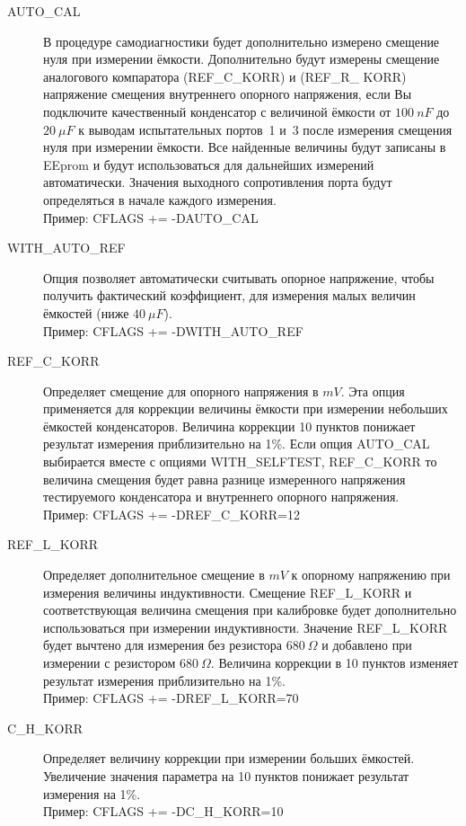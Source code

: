 \begin{description}
  \item[AUTO\_CAL] В процедуре самодиагностики будет дополнительно измерено смещение нуля при измерении ёмкости. 
Дополнительно будут измерены смещение аналогового компаратора (REF\_C\_KORR) и (REF\_R\_ KORR) напряжение смещения 
внутреннего опорного напряжения, если Вы подключите качественный конденсатор с величиной ёмкости от \(100~nF\) 
до \(20~\mu F\) к выводам испытательных портов~1 и~3 после измерения смещения нуля при измерении ёмкости. Все 
найденные величины будут записаны в EEprom и будут использоваться для дальнейших измерений автоматически. Значения 
выходного сопротивления порта будут определяться в начале каждого измерения.\\
Пример: CFLAGS += -DAUTO\_CAL

  \item[WITH\_AUTO\_REF] Опция позволяет автоматически считывать опорное напряжение, чтобы
получить фактический коэффициент, для измерения малых величин ёмкостей (ниже \(40~\mu F\)).\\
Пример:  CFLAGS += -DWITH\_AUTO\_REF

  \item[REF\_C\_KORR] Определяет смещение для опорного напряжения в \(mV\). Эта опция применяется для 
коррекции величины ёмкости при измерении небольших ёмкостей конденсаторов. Величина коррекции 10 пунктов понижает 
результат измерения приблизительно на 1\%. Если опция AUTO\_CAL выбирается вместе с опциями 
WITH\_SELFTEST, REF\_C\_KORR то величина смещения будет равна разнице измеренного напряжения тестируемого 
конденсатора и внутреннего опорного напряжения.\\
Пример:  CFLAGS += -DREF\_C\_KORR=12

  \item[REF\_L\_KORR] Определяет дополнительное смещение в \(mV\) к опорному напряжению при измерения величины 
индуктивности. Смещение REF\_L\_KORR и соответствующая величина смещения при калибровке будет дополнительно 
использоваться при измерении индуктивности. Значение REF\_L\_KORR будет вычтено для измерения без 
резистора \(680~\Omega\) и добавлено при измерении с резистором \(680~\Omega\).
Величина коррекции в 10 пунктов изменяет результат измерения приблизительно на 1\%.\\
Пример: CFLAGS += -DREF\_L\_KORR=70

  \item[C\_H\_KORR] Определяет величину коррекции при измерении больших ёмкостей. Увеличение значения параметра на 10 пунктов 
понижает результат измерения на 1\%.\\
Пример:  CFLAGS += -DC\_H\_KORR=10


\end{description}

